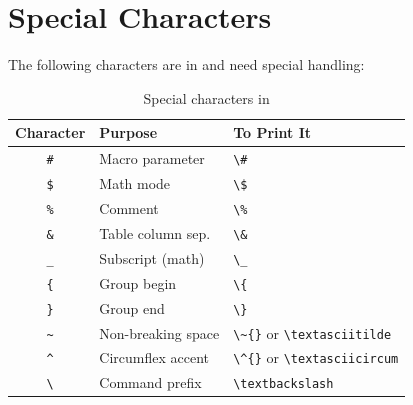\section{Special Characters}

The following characters are  in \latex{} and need special handling:

\begin{table}[H]
\centering
\begin{tabular}{cll}
\toprule
\textbf{Character} & \textbf{Purpose} & \textbf{To Print It} \\
\midrule
\texttt{\#}  & Macro parameter      & \verb|\#| \\
\texttt{\$}  & Math mode            & \verb|\$| \\
\texttt{\%}  & Comment              & \verb|\%| \\
\texttt{\&}  & Table column sep.    & \verb|\&| \\
\texttt{\_}  & Subscript (math)     & \verb|\_| \\
\texttt{\{}  & Group begin          & \verb|\{| \\
\texttt{\}}  & Group end            & \verb|\}| \\
\texttt{\~{}}& Non-breaking space   & \verb|\~{}| or \verb|\textasciitilde| \\
\texttt{\^{}}& Circumflex accent    & \verb|\^{}| or \verb|\textasciicircum| \\
\texttt{\textbackslash} & Command prefix & \verb|\textbackslash| \\
\bottomrule
\end{tabular}
\caption{Special characters in \latex{}}
\end{table}

